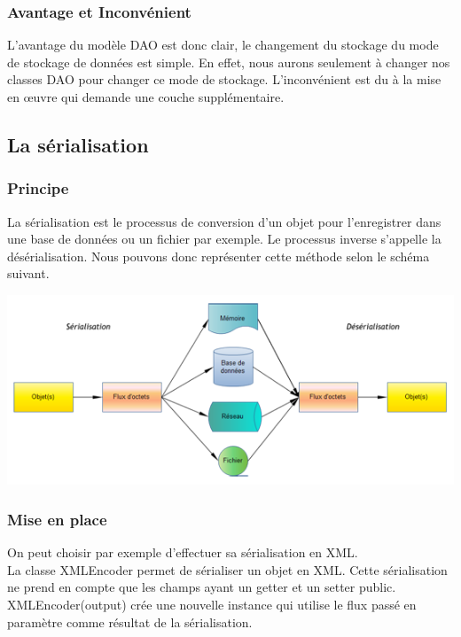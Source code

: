 \subsubsection{Avantage et Inconvénient}
L'avantage du modèle DAO est donc clair, le changement du stockage du mode de stockage de données est simple. En effet, nous aurons seulement à changer nos classes DAO pour changer ce mode de stockage. L'inconvénient est du à la mise en œuvre qui demande une couche supplémentaire. 


\subsection{La sérialisation}

\subsubsection{Principe}

La sérialisation est le processus de conversion d'un objet pour l'enregistrer dans une base de données ou un fichier par exemple. Le processus inverse s'appelle la désérialisation. Nous pouvons donc représenter cette méthode selon le schéma suivant. 

\begin{center}
\includegraphics[scale=0.5]{../graph/serialisation.png} \\
\end{center}

\subsubsection{Mise en place}
On peut choisir par exemple d'effectuer sa sérialisation en XML. \\

La classe XMLEncoder permet de sérialiser un objet en XML. Cette sérialisation ne prend en compte que les champs ayant un getter et un setter public. XMLEncoder(output) crée une nouvelle instance qui utilise le flux passé en paramètre comme résultat de la sérialisation. \\

